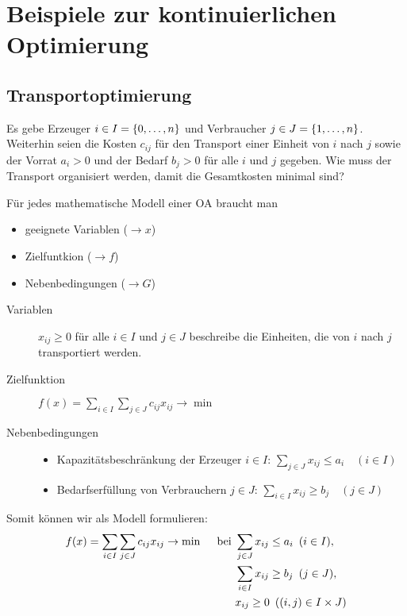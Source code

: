 \section{Beispiele zur kontinuierlichen Optimierung}

\subsection{Transportoptimierung}

Es gebe Erzeuger $i \in I = \left\{ 0, \dots , n \right\}$ und Verbraucher $j \in J = \left\{ 1, \dots , n \right\}$. Weiterhin seien die Kosten $c_{ij}$ für den Transport einer Einheit von $i$ nach $j$ sowie der Vorrat $a_i > 0$ und der Bedarf $b_j > 0$ für alle $i$ und $j$ gegeben. Wie muss der Transport organisiert werden, damit die Gesamtkosten minimal sind?

Für jedes mathematische Modell einer OA braucht man
\begin{itemize}[nolistsep, topsep=-\parskip]
	\item geeignete Variablen ($\to x$)
	\item Zielfuntkion ($\to f$)
	\item Nebenbedingungen ($\to G$)
\end{itemize}

\begin{description}
	\item[Variablen] $x_{ij} \ge 0$ für alle $i \in I$ und $j \in J$ beschreibe die Einheiten, die von $i$ nach $j$ transportiert werden.
	\item[Zielfunktion] $f(x) = \sum\limits_{i \in I} \sum\limits_{j \in J} c_{ij} x_{ij} \to \min$
	\item[Nebenbedingungen] \leavevmode
	\begin{itemize}[nolistsep, topsep=-\parskip]
		\item Kapazitätsbeschränkung der Erzeuger $i \in I$: $\sum\limits_{j \in J} x_{ij} \le a_i \quad (i \in I)$
		\item Bedarfserfüllung von Verbrauchern $j \in J$: $\sum\limits_{i \in I} x_{ij} \ge b_j \quad (j \in J) $
	\end{itemize}
\end{description}

Somit können wir als Modell formulieren:
\begin{equation*}
	\begin{aligned}
	f(x) = \sum_{i \in I} \sum_{j \in J} c_{ij} x_{ij} \to \min \quad \text{ bei } &\sum_{j \in J} x_{ij} \le a_i \enskip (i \in I), \\
	&\sum_{i \in I} x_{ij} \ge b_j \enskip (j \in J), \\
	& x_{ij} \ge 0 \enskip ((i,j) \in I \times J)
	\end{aligned}
\end{equation*}